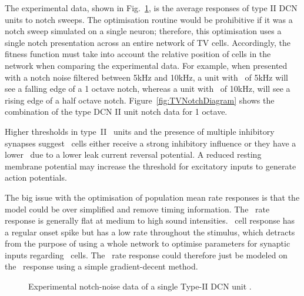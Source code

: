 
The experimental data, shown in Fig.~\ref{fig:TVReissFig9}, is the average responses of type II DCN units to notch sweeps.
The optimisation routine would be prohibitive if it was a notch sweep simulated on a single neuron; therefore, this optimisation uses a single notch presentation across an entire network of TV cells.
Accordingly, the fitness function must take into account the relative position of cells in the network when comparing the experimental data.
For example, when presented with a notch noise filtered between 5kHz and 10kHz, a unit with \CF~of 5kHz will see a falling edge of a 1 octave notch, whereas a unit with \CF~of 10kHz, will see a rising edge of a half octave notch.
Figure~\ref{fig:TVNotchDiagram} shows the combination of the type DCN II unit notch data for 1 octave.



Higher thresholds in type~II \DCN~units \citep{SpirouDavisEtAl:1999} and the presence of multiple inhibitory synapses \citep{Alibardi:2006} suggest \TV~cells either receive a strong inhibitory influence or they have a lower \RMP~due to a lower leak current reversal potential. A reduced resting membrane potential may increase the threshold for excitatory inputs to generate action potentials.



The big issue with the optimisation of population mean rate responses is that the model could be over simplified and remove timing information.
The \HSR~rate response is generally flat at medium to high sound intensities.
\DS~cell response has a regular onset spike but has a low rate throughout the stimulus, which detracts from the purpose of using a whole network to optimise parameters for synaptic inputs regarding \TV~cells.
The \TV~rate response could therefore just be modeled on the \LSR~response using a simple gradient-decent method.



\begin{figure}[htb]
\centering 
{}
\caption[Experimental notch-noise data of a single Type-II DCN unit]{Experimental notch-noise data of a single Type-II DCN unit \citep[,~Fig.~9]{ReissYoung:2005}.
}
\label{fig:TVReissFig9}
\end{figure}



